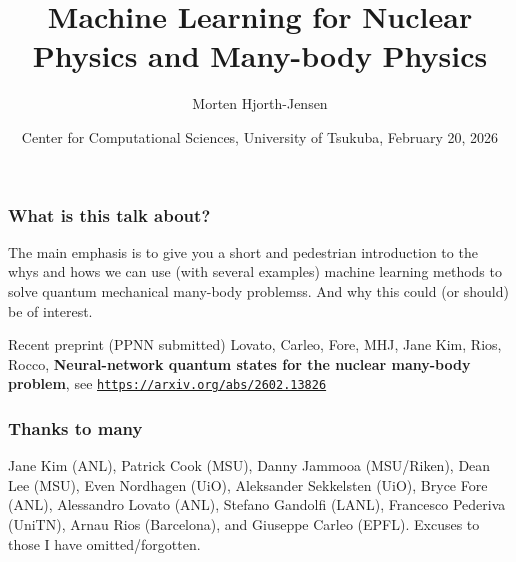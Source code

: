 \documentclass{beamer}
\begin{document}

\newcommand{\exercisesection}[1]{\subsection*{#1}}







\title{Machine Learning for Nuclear Physics and Many-body Physics}


\author{Morten Hjorth-Jensen}

\date{Center for Computational Sciences, University of Tsukuba, February 20, 2026
}

\begin{frame}
\titlepage
\end{frame}

\begin{frame}
\frametitle{What is this talk about?}

\begin{block}{}
The main emphasis is to give you a short and pedestrian introduction to the whys and hows we can use (with several examples) machine learning methods to solve quantum mechanical many-body problemss. And why this could (or should) be of interest. 
\end{block}

\begin{block}{Recent preprint (PPNN submitted) }
Lovato, Carleo, Fore, MHJ, Jane Kim, Rios, Rocco, \textbf{Neural-network quantum states for the nuclear many-body problem}, see \href{{https://arxiv.org/abs/2602.13826}}{\nolinkurl{https://arxiv.org/abs/2602.13826}}
\end{block}
\end{frame}

\begin{frame}
\frametitle{Thanks to many}

Jane Kim (ANL), Patrick Cook (MSU), Danny Jammooa (MSU/Riken), Dean
Lee (MSU), Even Nordhagen (UiO), Aleksander Sekkelsten (UiO), Bryce Fore (ANL), Alessandro Lovato
(ANL), Stefano Gandolfi (LANL), Francesco Pederiva (UniTN), Arnau Rios
(Barcelona), and Giuseppe Carleo (EPFL).  Excuses to those I have
omitted/forgotten.
\end{frame}
\end{document}
